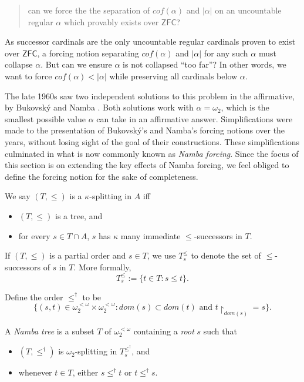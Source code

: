 \documentclass[12pt]{article}
\numberwithin{equation}{section}
\begin{document}
\begin{quote}
    can we force the the separation of $cof(\alpha)$ and $|\alpha|$ on an uncountable regular $\alpha$ which provably exists over $\mathsf{ZFC}$?
\end{quote}

As successor cardinals are the only uncountable regular cardinals proven to exist over $\mathsf{ZFC}$, a forcing notion separating $cof(\alpha)$ and $|\alpha|$ for any such $\alpha$ must collapse $\alpha$. But can we ensure $\alpha$ is not collapsed ``too far''? In other words, we want to force $cof(\alpha) < |\alpha|$ while preserving all cardinals below $\alpha$.

The late 1960s saw two independent solutions to this problem in the affirmative, by Bukovsk\'{y} \cite{bukovsky} and Namba \cite{namba}. Both solutions work with $\alpha = \omega_2$, which is the smallest possible value $\alpha$ can take in an affirmative answer. Simplifications were made to the presentation of Bukovsk\'{y}'s and Namba's forcing notions over the years, without losing sight of the goal of their constructions. These simplifications culminated in what is now commonly known as \emph{Namba forcing}. Since the focus of this section is on extending the key effects of Namba forcing, we feel obliged to define the forcing notion for the sake of completeness.

\begin{defi}
We say $(T, \leq)$ is a $\kappa$-splitting in $A$ iff
\begin{itemize}
    \item $(T, \leq)$ is a tree, and
    \item for every $s \in T \cap A$, $s$ has $\kappa$ many immediate $\leq$-successors in $T$. 
\end{itemize}
\end{defi}

\begin{defi}
If $(T, \leq)$ is a partial order and $s \in T$, we use $T_s^{\leq}$ to denote the set of $\leq$-successors of $s$ in $T$. More formally, $$T_s^{\leq} := \{t \in T : s \leq t\}.$$ 
\end{defi}

\begin{defi}
Define the order $\leq^{\dagger}$ to be $$\{(s, t) \in \omega_2^{< \omega} \times \omega_2^{< \omega} : dom(s) \subset dom(t) \text{ and } t \! \restriction_{dom(s)} = s\}.$$
\end{defi}

\begin{defi}
A \emph{Namba tree} is a subset $T$ of $\omega_2^{< \omega}$ containing a \emph{root} $s$ such that
\begin{itemize}
    \item $(T, \leq^{\dagger})$ is $\omega_2$-splitting in $T_s^{\leq^{\dagger}}$, and
    \item whenever $t \in T$, either $s \leq^{\dagger} t$ or $t \leq^{\dagger} s$. 
\end{itemize}
\end{defi}
\end{document}
